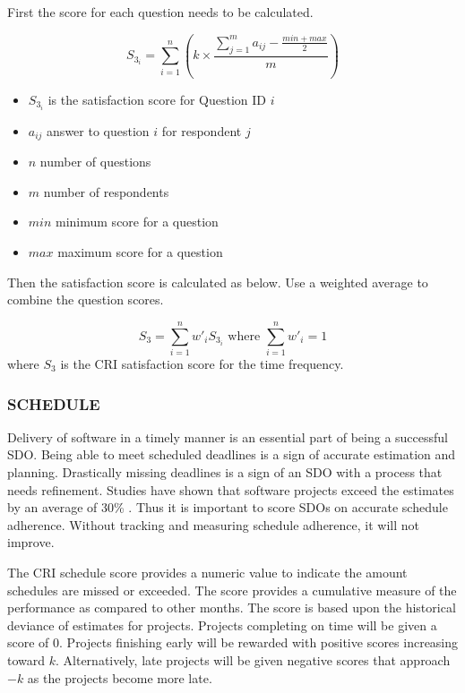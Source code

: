\documentclass[SDSUThesis.tex]{subfiles}
\begin{document}
                First the score for each question needs to be calculated.
                
                \[
                    S_{3_i} = \sum^n_{i=1}\left( k \times \frac{ \sum^m_{j=1}a_{ij}-\frac{min + max}{2}}{m} \right)
                \]
                
                \begin{itemize}
                    \item $S_{3_i}$ is the satisfaction score for Question ID $i$
                    \item $a_{ij}$ answer to question $i$ for respondent $j$
                    \item $n$ number of questions
                    \item $m$ number of respondents
                    \item $min$ minimum score for a question
                    \item $max$ maximum score for a question
                \end{itemize}
                
                Then the satisfaction score is calculated as below.  Use a weighted average
                to combine the question scores.
                
                \[
                    S_{3} = \sum\limits^n_{i=1} w'_i S_{3_i} \text{ where } \sum\limits^n_{i=1} w'_i = 1
                \]
                where $S_3$ is the CRI satisfaction score for the time frequency.

        \subsubsection{SCHEDULE}  
            Delivery of software in a timely manner is an essential part of being a 
            successful SDO.  Being able to meet scheduled deadlines is a sign of accurate
            estimation and planning.  Drastically missing deadlines is a sign of an SDO
            with a process that needs refinement.  Studies have shown that 
            software projects exceed the estimates by an average of
            30\% \cite{Jorgensen2014}.  Thus it is important to score SDOs on accurate
            schedule adherence. Without tracking and measuring schedule adherence, it will
            not improve.  
            
            The CRI schedule score provides a numeric value to indicate the amount 
            schedules are missed or exceeded.  The score provides a cumulative measure
            of the performance as compared to other months.
            The score is based upon the historical deviance of estimates for
            projects.  Projects completing on time will be given a score of 0.
            Projects finishing early will be rewarded with positive scores increasing toward
            $k$. Alternatively, 
            late projects will be given negative scores that approach $-k$ as the projects
            become more late. 
            
\end{document}
